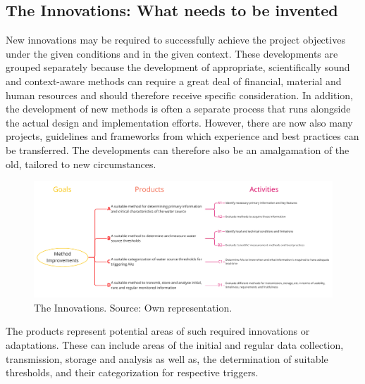 \subsection{The Innovations: What needs to be invented}\label{subsubsec:innovations}
New innovations may be required to successfully achieve the project objectives under the given conditions and in the given context. These developments are grouped separately because the development of appropriate, scientifically sound and context-aware methods can require a great deal of financial, material and human resources and should therefore receive specific consideration. In addition, the development of new methods is often a separate process that runs alongside the actual design and implementation efforts. However, there are now also many projects, guidelines and frameworks from which experience and best practices can be transferred. The developments can therefore also be an amalgamation of the old, tailored to new circumstances.\newline

\begin{figure}[!htp]
    \centering
    \includegraphics[width=1.0\textwidth]{figures/2023_MA_results_innovation.pdf}
    \decoRule
    \caption[PRC: The Innovations]{The Innovations. Source: Own representation.}
    \label{fig:res_innovations}
\end{figure}
The products represent potential areas of such required innovations or adaptations. These can include areas of the initial and regular data collection, transmission, storage and analysis as well as, the determination of suitable thresholds, and their categorization for respective triggers.

